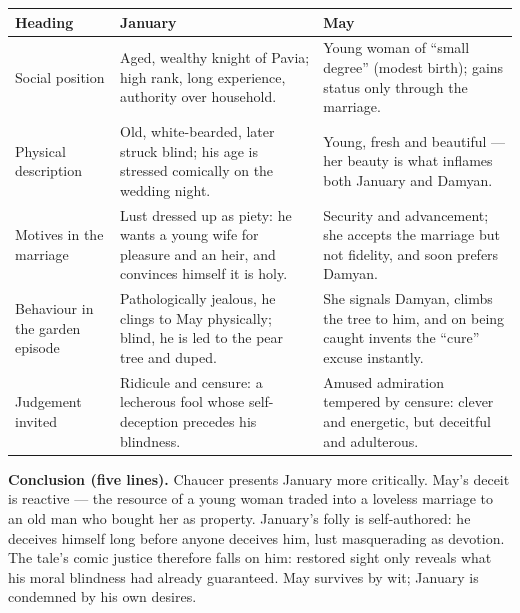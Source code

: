 \documentclass[11pt]{article}
\begin{document}
\begin{corrige}
\begin{center}
\begin{tabularx}{\linewidth}{|l|X|X|}
\hline
\rowcolor{popblueL} \textbf{Heading} & \textbf{January} & \textbf{May} \\
\hline
Social position & Aged, wealthy knight of Pavia; high rank, long experience, authority over household. & Young woman of ``small degree'' (modest birth); gains status only through the marriage. \\
\hline
Physical description & Old, white-bearded, later struck blind; his age is stressed comically on the wedding night. & Young, fresh and beautiful --- her beauty is what inflames both January and Damyan. \\
\hline
Motives in the marriage & Lust dressed up as piety: he wants a young wife for pleasure and an heir, and convinces himself it is holy. & Security and advancement; she accepts the marriage but not fidelity, and soon prefers Damyan. \\
\hline
Behaviour in the garden episode & Pathologically jealous, he clings to May physically; blind, he is led to the pear tree and duped. & She signals Damyan, climbs the tree to him, and on being caught invents the ``cure'' excuse instantly. \\
\hline
Judgement invited & Ridicule and censure: a lecherous fool whose self-deception precedes his blindness. & Amused admiration tempered by censure: clever and energetic, but deceitful and adulterous. \\
\hline
\end{tabularx}
\end{center}
\textbf{Conclusion (five lines).} Chaucer presents January more critically. May's deceit is reactive --- the resource of a young woman traded into a loveless marriage to an old man who bought her as property. January's folly is self-authored: he deceives himself long before anyone deceives him, lust masquerading as devotion. The tale's comic justice therefore falls on him: restored sight only reveals what his moral blindness had already guaranteed. May survives by wit; January is condemned by his own desires.
\end{corrige}
\end{document}
